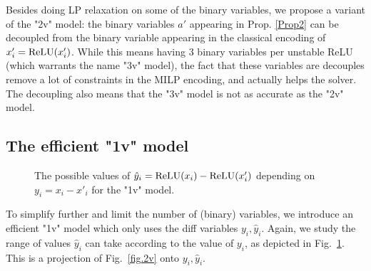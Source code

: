	Besides doing LP relaxation on some of the binary variables, we propose a 
    variant of the "2v" model: the binary variables $a'$ appearing in 
    Prop. \ref{Prop2} can be decoupled from the binary variable appearing in the classical encoding of $x'_i = \mathrm{ReLU}(x'_i)$. While this means having 3 binary variables per unstable ReLU (which warrants the name "3v" model), the fact that these variables are decouples remove a lot of constraints in the MILP encoding, and actually helps the solver. The decoupling also means that the "3v" model is not as accurate as the "2v" model.


	\subsection{The efficient "1v" model}

		\begin{figure}[t!]
		\centering
	\hspace*{10ex}
\caption{The possible values of $\hat{y}_i=\mathrm{ReLU}(x_i)-\mathrm{ReLU}(x'_i)$ depending on $y_i = x_i-x'_i$ for the "1v" model.}
	\label{fig.1v}
\end{figure}



	To simplify further and limit the number of (binary) variables, 
    we introduce an efficient "1v" model which only uses the diff variables $y_i,\hat{y}_i$. Again, we study the range of values $\hat{y}_i$ can take according to the value of $y_i$, as depicted in Fig.~\ref{fig.1v}. This is a projection of Fig.~\ref{fig.2v} onto $y_i,\hat{y}_i$.
    
